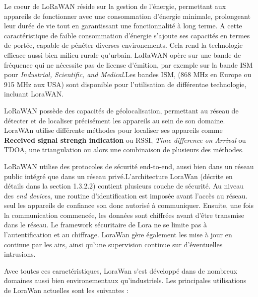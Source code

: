 \vspace{0.1cm}

Le coeur de LoRaWAN réside sur la gestion de l'énergie, permettant aux appareils de fonctionner avec une consommation d'énergie minimale, prolongeant leur durée de vie tout en garantissant une fonctionnalité à long terme. A cette caractéristique de faible consommation d'énergie s'ajoute ses capacités en termes de portée, capable de pénéter diverses environements. Cela rend la technologie efficace aussi bien milieu rurale qu'urbain. LoRaWAN opère sur une bande de fréquence qui ne nécessite pas de license d'émition, par exemple sur la bande ISM pour \textit{Industrial, Scientific, and Medical}.Les bandes ISM, (868 MHz en Europe ou 915 MHz aux USA) sont disponible pour l'utilisation de différentae technologie, incluant LoraWAN.

\vspace{0.1cm}

LoRaWAN possède des capacités de géolocalisation, permettant au réseau de détecter et de localiser précisément les appareils au sein de son domaine. LoraWAn utilise différente méthodes pour localiser ses appareils comme \textbf{Received signal strengh indication} ou RSSI, \textit{Time difference on Arrival} ou TDOA, une triangulation ou alors une combinaison de plusieurs des méthodes.

\vspace{0.1cm}

LoRaWAN utilise des protocoles de sécurité end-to-end, aussi bien dans un réseau public intégré que dans un réseau privé.L'architecture LoraWan (décrite en détails dans la section 1.3.2.2) contient plusieurs couche de sécurité. Au niveau des \textit{end devices}, une routine d'identification est imposée avant l'accès au réseau. seul les appareils de confiance son donc autorisé à communiquer. Ensuite, une fois la communication commencée, les données sont chiffrées avant d'être transmise dans le réseau. Le framework sécuritaire de Lora ne se limite pas à l'autentification et au chiffrage. LoraWan gère également les mise à jour en continue par les airs, ainsi qu'une supervision continue sur d'éventuelles intrusions.

\vspace{0.1cm}

Avec toutes ces caractéristiques, LoraWan s'est développé dans de nombreux domaines aussi bien environementaux qu'industriels. Les principales utilisations de LoraWan actuelles sont les suivantes :

\vspace{0.1cm}

